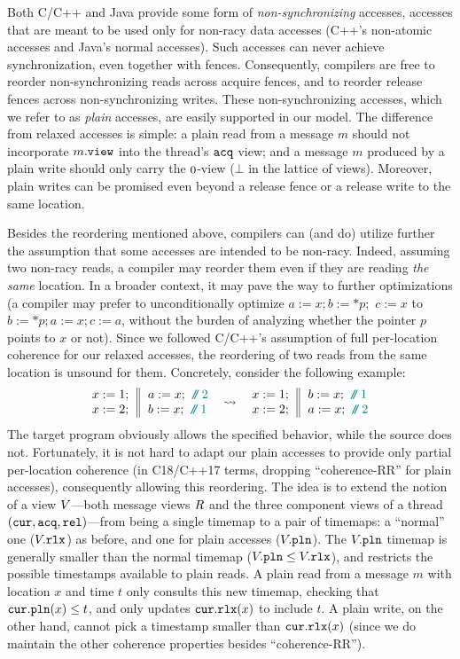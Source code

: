 Both C/C++ and Java provide some form of \emph{non-synchronizing} accesses, \ie accesses that are meant to be used only for non-racy data accesses
(C++'s non-atomic accesses and Java's normal accesses).
Such accesses can never achieve synchronization, even together with fences.
Consequently, compilers are free to reorder non-synchronizing reads across acquire fences, and to reorder release fences across non-synchronizing writes.
These non-synchronizing accesses, which we refer to as \emph{plain} accesses, are easily supported in our model.
The difference from relaxed accesses is simple:
a plain read from a message $m$ should not incorporate $m.\texttt{view}$ into the thread's ${\texttt{acq}}$ view;
and a message $m$ produced by a plain write should only carry the $\mbox{\small0}$-view (\ie $\bot$ in the lattice of views).
Moreover, plain writes can be promised even beyond a release fence or a release write to the same location.

Besides the reordering mentioned above, compilers can (and do) utilize further the assumption that some accesses 
are intended to be non-racy.
Indeed, assuming two non-racy reads, a compiler may reorder them even if they are reading \emph{the same} location.
In a broader context, it may pave the way to further optimizations 
(\eg a compiler may prefer to unconditionally optimize $a:=x; b:=*p;$ $c:=x$ to $b:=*p; a:=x; c:=a$, 
without the burden of analyzing whether the pointer $p$ points to $x$ or not).
Since we followed C/C++'s assumption of full per-location coherence for our relaxed accesses, 
the reordering of two reads from the same location is unsound for them. 
Concretely, consider the following example:
$$
\inarrII{x:=1;\\ x:=2;}{a:=x;\comment{2}\\ b:=x;\comment{1}} \quad \leadsto \quad
\inarrII{x:=1;\\ x:=2;}{b:=x;\comment{1}\\ a:=x;\comment{2}}
$$
The target program obviously allows the specified behavior, while the source does not.
Fortunately, it is not hard to adapt our plain accesses to provide only partial per-location coherence
(in C18/C++17 terms, dropping ``coherence-RR'' for plain accesses), consequently allowing this reordering.
The idea is to extend the notion of a view $V$---both message views $R$ and the
three component views of a thread $({\texttt{cur}},{\texttt{acq}},{\texttt{rel}})$---from being a single timemap to a pair of timemaps:
a ``normal'' one ($V.{\texttt{rlx}}$) as before, and one for plain accesses ($V.{\texttt{pln}}$).
The $V.{\texttt{pln}}$ timemap is generally smaller than the normal timemap ($V.{\texttt{pln}} \leq V.{\texttt{rlx}}$),
and restricts the possible timestamps available to plain reads.
A plain read from a message $m$ with location $x$ and time $t$ only consults this new timemap,
checking that ${\texttt{cur}}.{\texttt{pln}}(x) \leq t$, and only updates ${\texttt{cur}}.{\texttt{rlx}}(x)$ to include $t$.
 A plain write, on the other hand, cannot pick a timestamp smaller than ${\texttt{cur}}.{\texttt{rlx}}(x)$ 
(since we do maintain the other coherence properties besides ``coherence-RR'').

